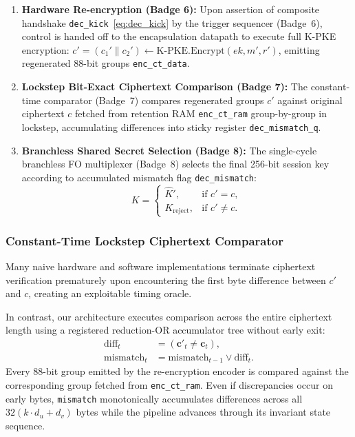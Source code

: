 \begin{enumerate}
    \item \textbf{Hardware Re-encryption (Badge 6):} Upon assertion of composite handshake \texttt{dec\_kick}~\eqref{eq:dec_kick} by the trigger sequencer (Badge~6), control is handed off to the encapsulation datapath to execute full K-PKE encryption: $c' = (c_1' \parallel c_2') \leftarrow \text{K-PKE.Encrypt}(ek, m', r')$, emitting regenerated 88-bit groups \texttt{enc\_ct\_data}.
    \item \textbf{Lockstep Bit-Exact Ciphertext Comparison (Badge 7):} The constant-time comparator (Badge~7) compares regenerated groups $c'$ against original ciphertext $c$ fetched from retention RAM \texttt{enc\_ct\_ram} group-by-group in lockstep, accumulating differences into sticky register \texttt{dec\_mismatch\_q}.
    \item \textbf{Branchless Shared Secret Selection (Badge 8):} The single-cycle branchless FO multiplexer (Badge~8) selects the final 256-bit session key according to accumulated mismatch flag \texttt{dec\_mismatch}:
    \begin{equation}
    \label{eq:shared_secret_mux}
    K = \begin{cases} \hat{K}', & \text{if } c' = c, \\ K_{\text{reject}}, & \text{if } c' \neq c. \end{cases}
    \end{equation}
\end{enumerate}

\subsubsection{Constant-Time Lockstep Ciphertext Comparator}
Many naive hardware and software implementations terminate ciphertext verification prematurely upon encountering the first byte difference between $c'$ and $c$, creating an exploitable timing oracle.

In contrast, our architecture executes comparison across the entire ciphertext length using a registered reduction-OR accumulator tree without early exit:
\begin{equation}
\label{eq:cmp_math}
\begin{aligned}
\text{diff}_t &= (\mathbf{c}'_t \neq \mathbf{c}_t), \\
\text{mismatch}_t &= \text{mismatch}_{t-1} \lor \text{diff}_t.
\end{aligned}
\end{equation}
Every 88-bit group emitted by the re-encryption encoder is compared against the corresponding group fetched from \texttt{enc\_ct\_ram}. Even if discrepancies occur on early bytes, \texttt{mismatch} monotonically accumulates differences across all $32(k \cdot d_u + d_v)$ bytes while the pipeline advances through its invariant state sequence.

